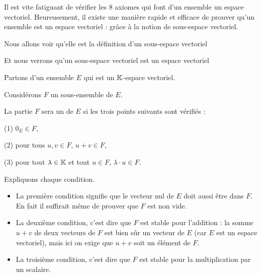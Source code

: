







\debuttexte


\diapo

\change

Il est vite fatiguant de vérifier les $8$ axiomes qui font d'un ensemble un espace vectoriel.
Heureusement, il existe une manière rapide et efficace de prouver qu'un ensemble est un espace vectoriel :
grâce à la notion de sous-espace vectoriel.

\change

Nous allons voir qu'elle est la définition d'un sous-espace vectoriel

\change

Et nous verrons qu'un sous-espace vectoriel est un espace vectoriel


\diapo

Partons d'un ensemble $E$ qui est un $\mathbb{K}$-espace vectoriel.

Considérons $F$ un sous-ensemble de $E$.

La partie $F$ sera un  de $E$ si 
les trois points suivants sont vérifiés :

(1) $0_E \in F$,

(2) pour tous $u,v \in F$, $u+v \in F$,
   
(3)  pour tout $\lambda \in \mathbb{K}$ et tout $u \in F$, $\lambda \cdot u \in F$. 



Expliquons chaque condition.
\begin{itemize}
  \item La première condition signifie que le vecteur nul de $E$ doit aussi être dans $F$.
  En fait il suffirait même de prouver que $F$ est non vide.
  
  \item La deuxième condition, c'est dire que $F$ est stable pour l'addition :
  la somme $u+v$ de deux vecteurs de $F$ est bien sûr un vecteur de $E$ 
  (car $E$ est un espace vectoriel),
  mais ici on exige que $u+v$ soit un élément de $F$. 
  
  \item  La troisième condition, c'est dire que $F$ est 
  stable pour la multiplication par un scalaire.
\end{itemize}



